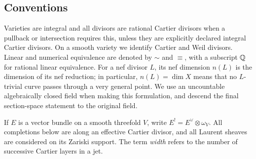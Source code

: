 \subsection{Conventions}

Varieties are integral and all divisors are rational Cartier divisors
when a pullback or intersection requires this, unless they are
explicitly declared integral Cartier divisors.  On a smooth variety
we identify Cartier and Weil divisors.  Linear and numerical
equivalence are denoted by $\sim$ and $\equiv$, with a subscript
$\mathbb Q$ for rational linear equivalence.  For a nef divisor $L$, its
nef dimension $n(L)$ is the dimension of its nef reduction; in
particular, $n(L)=\dim X$ means that no $L$-trivial curve passes
through a very general point.  We use an uncountable algebraically
closed field when making this formulation, and descend the final
section-space statement to the original field.

If $E$ is a vector bundle on a smooth threefold $V$, write
$E^!=E^\vee\otimes\omega_V$.  All completions below are along an
effective Cartier divisor, and all Laurent sheaves are considered on
its Zariski support.  The term \emph{width} refers to the number of
successive Cartier layers in a jet.
